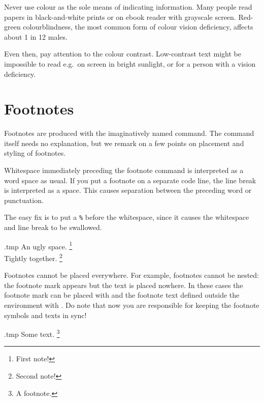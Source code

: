 \begin{practices}
Never use colour as the sole means of indicating information.
Many people read papers in black-and-white prints
or on ebook reader with grayscale screen.
Red-green colourblindness,
the most common form of colour vision deficiency,
affects about 1 in 12 males.

Even then, pay attention to the colour contrast.
Low-contrast text might be impossible to read e.g.\ on screen in bright sunlight,
or for a person with a vision deficiency.
\end{practices}


%
%
%
\section{Footnotes}

Footnotes are produced with the imaginatively named  command.
The command itself needs no explanation,
but we remark on a few points on placement and styling of footnotes.

\begin{gotcha}
Whitespace immediately preceding the footnote command is interpreted as a word space as usual.
If you put a footnote on a separate code line,
the line break is interpreted as a space.
This causes separation between the preceding word or punctuation.

The easy fix is to put a \verb|%| before the whitespace,
since it causes the whitespace and line break to be swallowed.
\begin{VerbatimOut}{\jobname.tmp}
An ugly space.
\footnote{First note!}\\

Tightly together.%
\footnote{Second note!}
\end{VerbatimOut}
\ShowExample
\end{gotcha}

Footnotes cannot be placed everywhere.
For example, footnotes cannot be nested:
the footnote mark appears but the text is placed nowhere.
In these cases the footnote mark can be placed with 
and the footnote text defined outside the environment with .
Do note that now you are responsible for keeping the footnote symbols and texts in sync!
%
\begin{VerbatimOut}{\jobname.tmp}
\renewcommand{\footnotemark}{\mpfootnotemark} %
Some text.%
\footnote{A footnote.\footnotemark}
\end{VerbatimOut}
\ShowExample[2]


